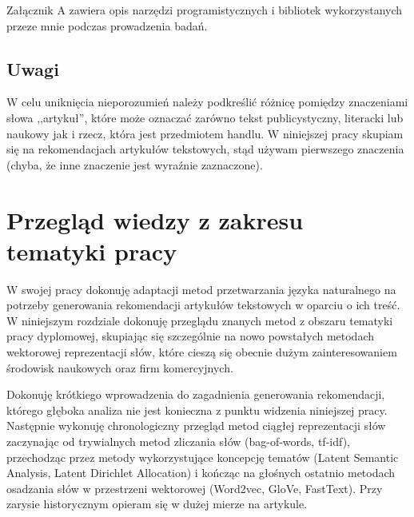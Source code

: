 \documentclass[pl]{minipw} %
\begin{document}
Załącznik A zawiera opis narzędzi programistycznych i bibliotek wykorzystanych przeze mnie podczas prowadzenia badań.

\section{Uwagi}
W celu uniknięcia nieporozumień należy podkreślić różnicę pomiędzy znaczeniami słowa ,,artykuł'', które może oznaczać zarówno tekst publicystyczny, literacki lub naukowy jak i rzecz, która jest przedmiotem handlu.\cite{slownik} W niniejszej pracy skupiam się na rekomendacjach artykułów tekstowych, stąd używam pierwszego znaczenia (chyba, że inne znaczenie jest wyraźnie zaznaczone).

\chapter{Przegląd wiedzy z zakresu tematyki pracy}
W swojej pracy dokonuję adaptacji metod przetwarzania języka naturalnego na potrzeby generowania rekomendacji artykułów tekstowych w oparciu o ich treść. W niniejszym rozdziale dokonuję przeglądu znanych metod z obszaru tematyki pracy dyplomowej, skupiając się szczególnie na nowo powstałych metodach wektorowej reprezentacji słów, które cieszą się obecnie dużym zainteresowaniem środowisk naukowych oraz firm komercyjnych. 

Dokonuję krótkiego wprowadzenia do zagadnienia generowania rekomendacji, którego głęboka analiza nie jest konieczna z punktu widzenia niniejszej pracy. Następnie wykonuję chronologiczny przegląd metod ciągłej reprezentacji słów zaczynając od trywialnych metod zliczania słów (bag-of-words, tf-idf), przechodząc przez metody wykorzystujące koncepcję tematów (Latent Semantic Analysis, Latent Dirichlet Allocation) i kończąc na głośnych ostatnio metodach osadzania słów w przestrzeni wektorowej (Word2vec, GloVe, FastText). Przy zarysie historycznym opieram się w dużej mierze na artykule\cite{aylien}.

\end{document}
